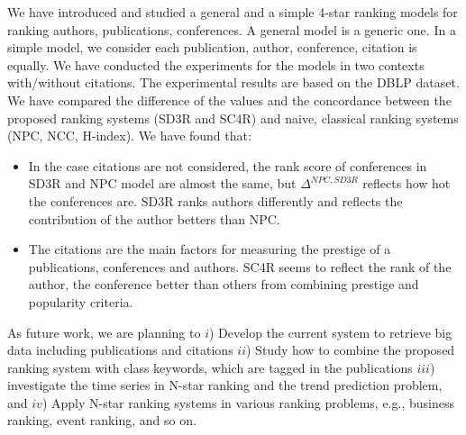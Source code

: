 \documentclass[10pt,leqno,twoside]{article}
\begin{document}
We have introduced and studied a general and a simple 4-star ranking models for ranking authors, publications, conferences. A general model is a generic one. In a simple model, we consider each publication, author, conference, citation is equally. We have conducted the experiments for the models in two contexts with/without citations. The experimental results are based on the DBLP dataset. We have compared the difference of the values and the concordance between the proposed ranking systems (SD3R and SC4R) and naive, classical ranking systems (NPC, NCC, H-index). We have found that: 
\begin{itemize}
\item In the case citations are not considered, the rank score of conferences in SD3R and NPC model are almost the same, but $\Delta^{NPC,SD3R}$ reflects how hot the conferences are. SD3R ranks authors differently and reflects the contribution of the author betters than NPC.
\item The citations are the main factors for measuring the prestige of a publications, conferences and authors. SC4R seems to reflect the rank of the author, the conference better than others from combining prestige and popularity criteria.
\end{itemize}

As future work, we are planning to $i$) Develop the current system to retrieve big data including publications and  citations  $ii$) Study how to combine the proposed ranking system with class keywords, which are tagged in the publications $iii$) investigate the time series in N-star ranking and the trend prediction problem, and $iv$) Apply N-star ranking systems in various ranking problems, e.g., business ranking, event ranking, and so on.
\end{document}
